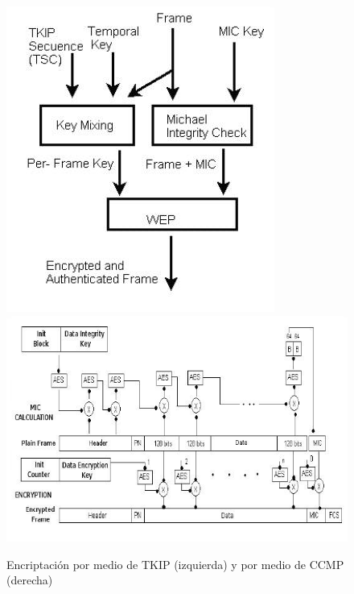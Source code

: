 \documentclass[10pt,a4paper]{article}
\begin{document}
\begin{figure}[ht]       
    \includegraphics[scale=0.6]{images/tkip_encription.jpg}   
    \hspace{10px}
    \includegraphics[scale=0.8]{images/ccmp_encription.jpg}
    \caption{Encriptación por medio de TKIP (izquierda) y por medio de CCMP (derecha)}
\end{figure}
\end{document}

